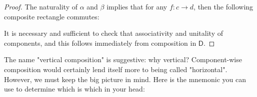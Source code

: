 \documentclass[10pt, oneside]{article}   	%
\newcommand{\cat}[1]{\mathsf{#1}}
\newcommand{\dd}{\cat{D}}
\newcommand{\at}{\alpha}
\newcommand{\bt}{\beta}
\begin{document}
\begin{proof}
The naturality of $\at$ and $\bt$ implies that for any $f : c \to d$, then the following composite rectangle commutes: 

\begin{center}
\end{center}

It is necessary and sufficient to check that associativity and unitality of components, and this follows immediately from composition in $\dd$.
\end{proof}

The name "vertical composition" is suggestive: why vertical? Component-wise composition would certainly lend itself more to being called "horizontal". However, we must keep the big picture in mind. Here is the mnemonic you can use to determine which is which in your head: 
\end{document}

